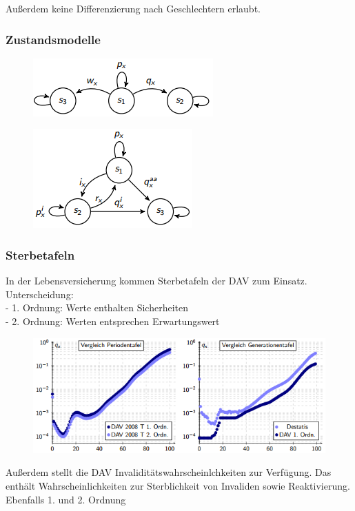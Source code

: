\documentclass[12pt]{report}
\theoremstyle{dotless}
\theoremstyle{definition}
\begin{document}
Außerdem keine Differenzierung nach Geschlechtern erlaubt.

\subsubsection{Zustandsmodelle}
\begin{figure}[ht]
	\centering
	\includegraphics[scale=1.2]{Bilder/Zustandsmodell_Leben1.png}
\end{figure}
\begin{figure}[ht]
	\centering
	\includegraphics[scale=1.2]{Bilder/Zustandsmodell_Leben2.png}
\end{figure}

\vspace{1cm}
\subsubsection{Sterbetafeln}
In der Lebensversicherung kommen Sterbetafeln der DAV zum Einsatz.\\
Unterscheidung: \\
- 1. Ordnung: Werte enthalten Sicherheiten\\
- 2. Ordnung: Werten entsprechen Erwartungswert

\begin{figure}[ht]
	\centering
	\includegraphics[scale=1]{Bilder/SterbetafelBsp2.png}
\end{figure}
Außerdem stellt die DAV Invaliditätswahrscheinlchkeiten zur Verfügung. Das enthält Wahrscheinlichkeiten zur Sterblichkeit von Invaliden sowie Reaktivierung. Ebenfalls 1. und 2. Ordnung
\end{document}
